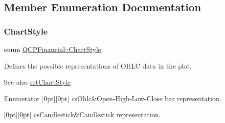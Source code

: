 \subsection{Member Enumeration Documentation}
\mbox{\label{class_q_c_p_financial_a0f800e21ee98d646dfc6f8f89d10ebfb}} 
\subsubsection{\texorpdfstring{Chart\+Style}{ChartStyle}}
{\footnotesize\ttfamily enum \mbox{\hyperlink{class_q_c_p_financial_a0f800e21ee98d646dfc6f8f89d10ebfb}{Q\+C\+P\+Financial\+::\+Chart\+Style}}}

Defines the possible representations of O\+H\+LC data in the plot.

\begin{DoxySeeAlso}{See also}
\mbox{\hyperlink{class_q_c_p_financial_a5a59175d36279d71596e64d7bb65596f}{set\+Chart\+Style}} 
\end{DoxySeeAlso}
\begin{DoxyEnumFields}{Enumerator}
[0pt][0pt]{}\mbox{\label{class_q_c_p_financial_a0f800e21ee98d646dfc6f8f89d10ebfba3a516016c9298d3e95dd82aa203c4390}} 
cs\+Ohlc&Open-\/\+High-\/\+Low-\/\+Close bar representation. \\
\hline

[0pt][0pt]{}\mbox{\label{class_q_c_p_financial_a0f800e21ee98d646dfc6f8f89d10ebfbac803cbd39f26e3f206bcc7028679e62f}} 
cs\+Candlestick&Candlestick representation. \\
\hline

\end{DoxyEnumFields}
\mbox{\label{class_q_c_p_financial_aef1761dda71a53dc5269685e9e492626}} 
